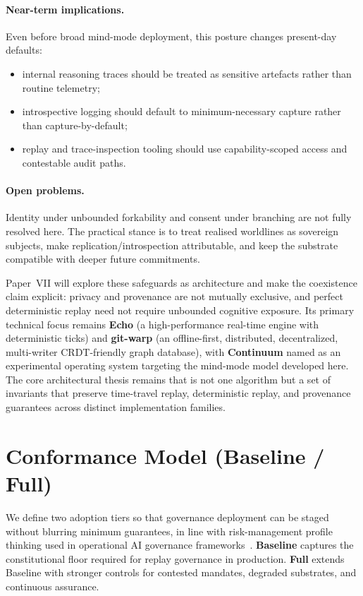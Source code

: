 \documentclass[11pt]{article}
\theoremstyle{definition}
\theoremstyle{plain}
\theoremstyle{remark}
\DeclareRobustCommand{\WARP}{\ifmmode\mathit{WARP}\else{\upshape\scshape warp}\fi}
\begin{document}
\paragraph{Near-term implications.}
Even before broad mind-mode deployment, this posture changes present-day defaults:
\begin{itemize}[leftmargin=*]
  \item internal reasoning traces should be treated as sensitive artefacts rather than routine telemetry;
  \item introspective logging should default to minimum-necessary capture rather than capture-by-default;
  \item replay and trace-inspection tooling should use capability-scoped access and contestable audit paths.
\end{itemize}

\paragraph{Open problems.}
Identity under unbounded forkability and consent under branching are not fully resolved here.
The practical stance is to treat realised worldlines as sovereign subjects, make replication/introspection attributable, and keep the substrate compatible with deeper future commitments.

Paper~VII will explore these safeguards as architecture and make the coexistence claim explicit:
privacy and provenance are not mutually exclusive, and perfect deterministic replay need not require
unbounded cognitive exposure.
Its primary technical focus remains \textbf{Echo} (a high-performance real-time engine with deterministic ticks)
and \textbf{git-warp} (an offline-first, distributed, decentralized, multi-writer CRDT-friendly graph database),
with \textbf{Continuum} named as an experimental operating system targeting the mind-mode model developed here.
The core architectural thesis remains that \WARP{} is not one algorithm but a set of invariants that preserve
time-travel replay, deterministic replay, and provenance guarantees across distinct implementation families.

\section{Conformance Model (Baseline / Full)}
\label{sec:conformance-model}

We define two adoption tiers so that governance deployment can be staged without blurring minimum guarantees, in line with risk-management profile thinking used in operational AI governance frameworks~\cite{nistairmf2023}.
\textbf{Baseline} captures the constitutional floor required for replay governance in production.
\textbf{Full} extends Baseline with stronger controls for contested mandates, degraded substrates, and continuous assurance.
\end{document}
